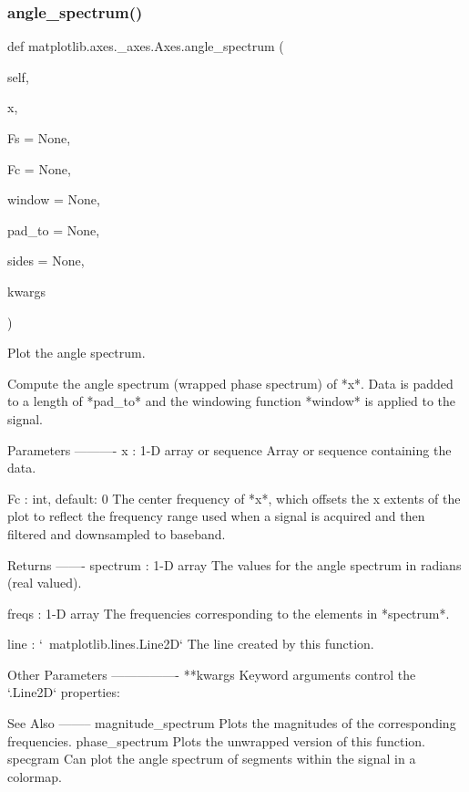 \subsubsection{\texorpdfstring{angle\+\_\+spectrum()}{angle\_spectrum()}}
{\footnotesize\ttfamily def matplotlib.\+axes.\+\_\+axes.\+Axes.\+angle\+\_\+spectrum (\begin{DoxyParamCaption}\item[{}]{self,  }\item[{}]{x,  }\item[{}]{Fs = {\ttfamily None},  }\item[{}]{Fc = {\ttfamily None},  }\item[{}]{window = {\ttfamily None},  }\item[{}]{pad\+\_\+to = {\ttfamily None},  }\item[{}]{sides = {\ttfamily None},  }\item[{}]{kwargs }\end{DoxyParamCaption})}

\begin{DoxyVerb}Plot the angle spectrum.

Compute the angle spectrum (wrapped phase spectrum) of *x*.
Data is padded to a length of *pad_to* and the windowing function
*window* is applied to the signal.

Parameters
----------
x : 1-D array or sequence
    Array or sequence containing the data.



Fc : int, default: 0
    The center frequency of *x*, which offsets the x extents of the
    plot to reflect the frequency range used when a signal is acquired
    and then filtered and downsampled to baseband.

Returns
-------
spectrum : 1-D array
    The values for the angle spectrum in radians (real valued).

freqs : 1-D array
    The frequencies corresponding to the elements in *spectrum*.

line : `~matplotlib.lines.Line2D`
    The line created by this function.

Other Parameters
----------------
**kwargs
    Keyword arguments control the `.Line2D` properties:


See Also
--------
magnitude_spectrum
    Plots the magnitudes of the corresponding frequencies.
phase_spectrum
    Plots the unwrapped version of this function.
specgram
    Can plot the angle spectrum of segments within the signal in a
    colormap.
\end{DoxyVerb}
 \mbox{\label{classmatplotlib_1_1axes_1_1__axes_1_1Axes_a8bfc86e6ac0c229240ff8d40416c5b4b}} 
